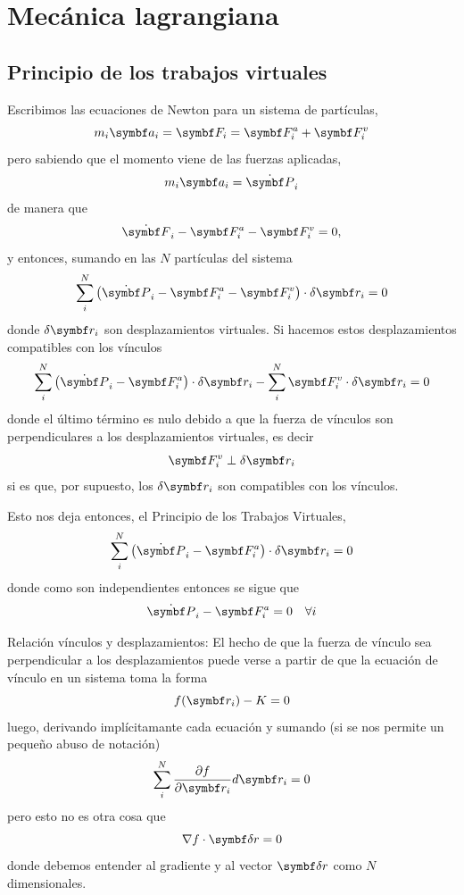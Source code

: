 \documentclass[10pt,oneside]{CBFT_book}
\begin{document}
\chapter{Mecánica lagrangiana}

\section{Principio de los trabajos virtuales}
Escribimos las ecuaciones de Newton para un sistema de partículas,
\[
	m_i \vb{a}_i = \vb{F}_i = \vb{F}_i^a + \vb{F}_i^v
\]
pero sabiendo que el momento viene de las fuerzas aplicadas,
\[
	m_i \vb{a}_i = \dot{\vb{P}}_i
\]
de manera que 
\[
	\dot{\vb{F}}_i - \vb{F}_i^a - \vb{F}_i^v = 0,
\]
y entonces, sumando en las $N$ partículas del sistema
\[
	\sum_i^N \left( \dot{\vb{P}}_i - \vb{F}_i^a - \vb{F}_i^v \right) \cdot \delta\vb{r}_i  = 0
\]
donde $\delta\vb{r}_i$ son desplazamientos virtuales. Si hacemos estos desplazamientos
compatibles con los vínculos
\[
	\sum_i^N \left( \dot{\vb{P}}_i - \vb{F}_i^a \right) \cdot \delta\vb{r}_i - 
	\sum_i^N  \vb{F}_i^v  \cdot \delta\vb{r}_i  = 0
\]
donde el último término es nulo debido a que la fuerza de vínculos son perpendiculares
a los desplazamientos virtuales, es decir 
\[
	\vb{F}_i^v \perp \delta\vb{r}_i
\]
si es que, por supuesto, los $\delta\vb{r}_i$ son compatibles con los vínculos.

Esto nos deja entonces, el Principio de los Trabajos Virtuales,
\[
	\sum_i^N \left( \dot{\vb{P}}_i - \vb{F}_i^a \right) \cdot \delta\vb{r}_i = 0 
\]
donde como son independientes entonces se sigue que
\[
	\dot{\vb{P}}_i - \vb{F}_i^a = 0 \quad \forall i
\]

\begin{notas}{Relación vínculos y desplazamientos:}
El hecho de que la fuerza de vínculo sea perpendicular a los desplazamientos puede
verse a partir de que la ecuación de vínculo en un sistema toma la forma
\[
	f(\vb{r}_i) - K = 0 
\]
luego, derivando implícitamante cada ecuación y sumando (si se nos permite un pequeño
abuso de notación)
\[
	\sum_i^N \dpar{f}{\vb{r}_i} d\vb{r}_i = 0 
\]
pero esto no es otra cosa que
\[
	\nabla f \cdot \vb{\delta r} = 0
\]
donde debemos entender al gradiente y al vector $\vb{\delta r}$ como $N$ dimensionales.
\end{notas}
\end{document}
